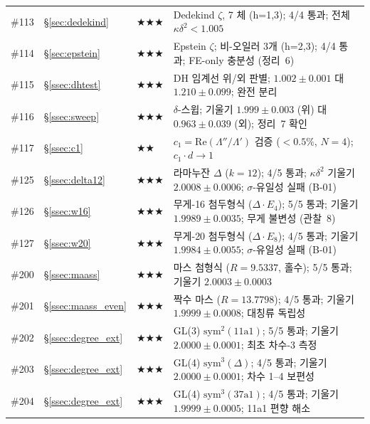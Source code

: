 \documentclass[11pt, a4paper]{article}
\theoremstyle{plain}
\theoremstyle{definition}
\begin{document}
\begin{longtable}{lllp{5.5cm}}
\#113 & \S\ref{sec:dedekind}      & \textbf{$\bigstar\bigstar\bigstar$}    & Dedekind $\zeta$, 7 체 (h=1,3); 4/4 통과; 전체 $\kappa\delta^{2}<1.005$ \\
\#114 & \S\ref{sec:epstein}       & \textbf{$\bigstar\bigstar\bigstar$}    & Epstein $\zeta$; 비-오일러 3개 (h=2,3); 4/4 통과; FE-only 충분성 (정리~6) \\
\#115 & \S\ref{ssec:dhtest}       & \textbf{$\bigstar\bigstar\bigstar$}    & DH 임계선 위/외 판별; $1.002\pm0.001$ 대 $1.210\pm0.099$; 완전 분리 \\
\#116 & \S\ref{ssec:sweep}        & \textbf{$\bigstar\bigstar\bigstar$}    & $\delta$-스윕; 기울기 $1.999\pm0.003$ (위) 대 $0.963\pm0.039$ (외); 정리~7 확인 \\
\#117 & \S\ref{ssec:c1}           & \textbf{$\bigstar\bigstar$}     & $c_{1}=\mathrm{Re}(\Lambda''/\Lambda')$ 검증 ($<0.5\%$, $N=4$); $c_{1}\cdot d\to 1$ \\
\#125 & \S\ref{ssec:delta12}      & \textbf{$\bigstar\bigstar\bigstar$}    & 라마누잔 $\Delta$ ($k=12$); 4/5 통과; $\kappa\delta^{2}$ 기울기 $2.0008\pm0.0006$; $\sigma$-유일성 실패 (B-01) \\
\#126 & \S\ref{ssec:w16}          & \textbf{$\bigstar\bigstar\bigstar$}    & 무게-16 첨두형식 ($\Delta\cdot E_4$); 5/5 통과; 기울기 $1.9989\pm0.0035$; 무게 불변성 (관찰~8) \\
\#127 & \S\ref{ssec:w20}          & \textbf{$\bigstar\bigstar\bigstar$}    & 무게-20 첨두형식 ($\Delta\cdot E_8$); 4/5 통과; 기울기 $1.9984\pm0.0055$; $\sigma$-유일성 실패 (B-01) \\
\#200 & \S\ref{ssec:maass}        & \textbf{$\bigstar\bigstar\bigstar$}    & 마스 첨형식 ($R{=}9.5337$, 홀수); 5/5 통과; 기울기 $\mathbf{2.0003\pm0.0003}$ \\
\#201 & \S\ref{ssec:maass_even}   & \textbf{$\bigstar\bigstar\bigstar$}    & 짝수 마스 ($R{=}13.7798$); 4/5 통과; 기울기 $1.9999\pm0.0008$; 대칭류 독립성 \\
\#202 & \S\ref{ssec:degree_ext}   & \textbf{$\bigstar\bigstar\bigstar$}    & GL(3) $\mathrm{sym}^{2}(\text{11a1})$; 5/5 통과; 기울기 $\mathbf{2.0000\pm0.0001}$; 최초 차수-3 측정 \\
\#203 & \S\ref{ssec:degree_ext}   & \textbf{$\bigstar\bigstar\bigstar$}    & GL(4) $\mathrm{sym}^{3}(\Delta)$; 4/5 통과; 기울기 $\mathbf{2.0000\pm0.0001}$; 차수 1--4 보편성 \\
\#204 & \S\ref{ssec:degree_ext}   & \textbf{$\bigstar\bigstar\bigstar$}    & GL(4) $\mathrm{sym}^{3}(\text{37a1})$; 4/5 통과; 기울기 $\mathbf{1.9999\pm0.0005}$; 11a1 편향 해소 \\

\end{longtable}
\end{document}
